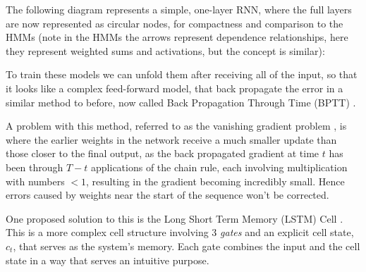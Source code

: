 \documentclass[bsc,singlespacing,logo, parskip, deptreport]{infthesis}
\begin{document}
The following diagram represents a simple, one-layer RNN, where the full layers are now represented as circular nodes, for compactness and comparison to the HMMs (note in the HMMs the arrows represent dependence relationships, here they represent weighted sums and activations, but the concept is similar):

\begin{center}
\end{center}

To train these models we can unfold them after receiving all of the input, so that it looks like a complex feed-forward model, that back propagate the error in a similar method to before, now called Back Propagation Through Time (BPTT) \cite{werbos1990backpropagation}.

A problem with this method, referred to as the vanishing gradient problem \cite{hochreiter1998vanishing}, is where the earlier weights in the network receive a much smaller update than those closer to the final output, as the back propagated gradient at time $t$ has been through $T - t$ applications of the chain rule, each involving multiplication with numbers $< 1$, resulting in the gradient becoming incredibly small. Hence errors caused by weights near the start of the sequence won't be corrected.

One proposed solution to this is the Long Short Term Memory (LSTM) Cell \cite{hochreiter1997long}. This is a more complex cell structure involving 3 {\em gates} and an explicit cell state, $c_t$, that serves as the system's memory. Each gate combines the input and the cell state in a way that serves an intuitive purpose.
\end{document}
